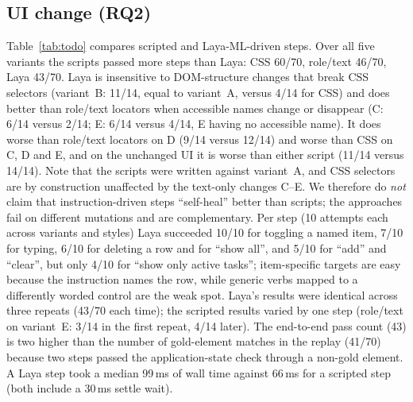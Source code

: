 \documentclass[11pt,a4paper]{article}
\begin{document}
\subsection{UI change (RQ2)}
Table~\ref{tab:todo} compares scripted and Laya-ML-driven steps. Over all five variants the scripts passed more steps than Laya: CSS 60/70, role/text 46/70, Laya 43/70. Laya is insensitive to DOM-structure changes that break CSS selectors (variant~B: 11/14, equal to variant~A, versus 4/14 for CSS) and does better than role/text locators when accessible names change or disappear (C: 6/14 versus 2/14; E: 6/14 versus 4/14, E having no accessible name). It does worse than role/text locators on D (9/14 versus 12/14) and worse than CSS on C, D and E, and on the unchanged UI it is worse than either script (11/14 versus 14/14). Note that the scripts were written against variant~A, and CSS selectors are by construction unaffected by the text-only changes C--E. We therefore do \emph{not} claim that instruction-driven steps ``self-heal'' better than scripts; the approaches fail on different mutations and are complementary. Per step (10 attempts each across variants and styles) Laya succeeded 10/10 for toggling a named item, 7/10 for typing, 6/10 for deleting a row and for ``show all'', and 5/10 for ``add'' and ``clear'', but only 4/10 for ``show only active tasks''; item-specific targets are easy because the instruction names the row, while generic verbs mapped to a differently worded control are the weak spot. Laya's results were identical across three repeats (43/70 each time); the scripted results varied by one step (role/text on variant~E: 3/14 in the first repeat, 4/14 later). The end-to-end pass count (43) is two higher than the number of gold-element matches in the replay (41/70) because two steps passed the application-state check through a non-gold element. A Laya step took a median 99\,ms of wall time against 66\,ms for a scripted step (both include a 30\,ms settle wait).

\begin{table}[t]\centering\small

\caption{Todo suite: steps passed (14 per cell). CSS and Role = scripted Playwright steps written against variant~A; Laya (Laya-ML) = instruction-driven steps (all 14), then split into literal and natural instructions (7 each).}\label{tab:todo}
\end{table}
\end{document}
